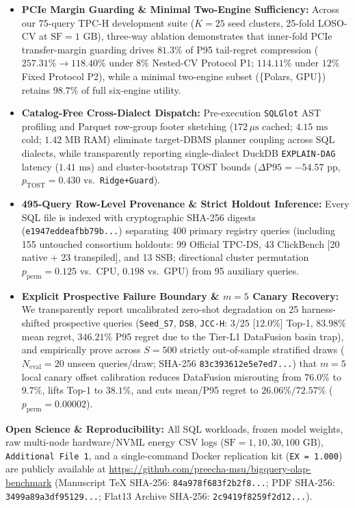 \documentclass[11pt,a4paper]{article}
\begin{document}
\begin{itemize}[leftmargin=1.5em,itemsep=3pt]
\item \textbf{PCIe Margin Guarding \& Minimal Two-Engine Sufficiency:} Across our 75-query TPC-H development suite ($K=25$ seed clusters, 25-fold LOSO-CV at $\text{SF}=1\text{ GB}$), three-way ablation demonstrates that inner-fold PCIe transfer-margin guarding drives $81.3\%$ of P95 tail-regret compression ($257.31\% \rightarrow 118.40\%$ under $8\%$ Nested-CV Protocol P1; $114.11\%$ under $12\%$ Fixed Protocol P2), while a minimal two-engine subset (\{Polars, GPU\}) retains $98.7\%$ of full six-engine utility.
\item \textbf{Catalog-Free Cross-Dialect Dispatch:} Pre-execution \texttt{SQLGlot} AST profiling and Parquet row-group footer sketching ($172\,\mu\text{s}$ cached; $4.15\text{ ms}$ cold; $1.42\text{ MB}$ RAM) eliminate target-DBMS planner coupling across SQL dialects, while transparently reporting single-dialect DuckDB \texttt{EXPLAIN-DAG} latency ($1.41\text{ ms}$) and cluster-bootstrap TOST bounds ($\Delta\text{P95}=-54.57\text{ pp}$, $p_{\text{TOST}}=0.430$ vs.\ \texttt{Ridge+Guard}).
\item \textbf{495-Query Row-Level Provenance \& Strict Holdout Inference:} Every SQL file is indexed with cryptographic SHA-256 digests (\texttt{e1947eddeafbb79b...}) separating 400 primary registry queries (including 155 untouched consortium holdouts: 99 Official TPC-DS, 43 ClickBench [20 native + 23 transpiled], and 13 SSB; directional cluster permutation $p_{\text{perm}}=0.125$ vs.\ CPU, $0.198$ vs.\ GPU) from 95 auxiliary queries.
\item \textbf{Explicit Prospective Failure Boundary \& $m=5$ Canary Recovery:} We transparently report uncalibrated zero-shot degradation on 25 harness-shifted prospective queries (\texttt{Seed\_S7}, \texttt{DSB}, \texttt{JCC-H}: $3/25$ [$12.0\%$] Top-1, $83.98\%$ mean regret, $346.21\%$ P95 regret due to the Tier-L1 DataFusion basin trap), and empirically prove across $S=500$ strictly out-of-sample stratified draws ($N_{\text{eval}}=20$ unseen queries/draw; SHA-256 \texttt{83c393612e5e7ed7...}) that $m=5$ local canary offset calibration reduces DataFusion misrouting from $76.0\%$ to $9.7\%$, lifts Top-1 to $38.1\%$, and cuts mean/P95 regret to $26.06\%/72.57\%$ ($p_{\text{perm}}=0.00002$).
\end{itemize}
\textbf{Open Science \& Reproducibility:} All SQL workloads, frozen model weights, raw multi-node hardware/NVML energy CSV logs ($\text{SF}=1,10,30,100\text{ GB}$), \texttt{Additional File 1}, and a single-command Docker replication kit (\texttt{EX = 1.000}) are publicly available at \url{https://github.com/preecha-msu/bigquery-olap-benchmark} (Manuscript TeX SHA-256: \texttt{84a978f683f2b2f8...}; PDF SHA-256: \texttt{3499a89a3df95129...}; Flat13 Archive SHA-256: \texttt{2c9419f8259f2d12...}).
\end{document}
